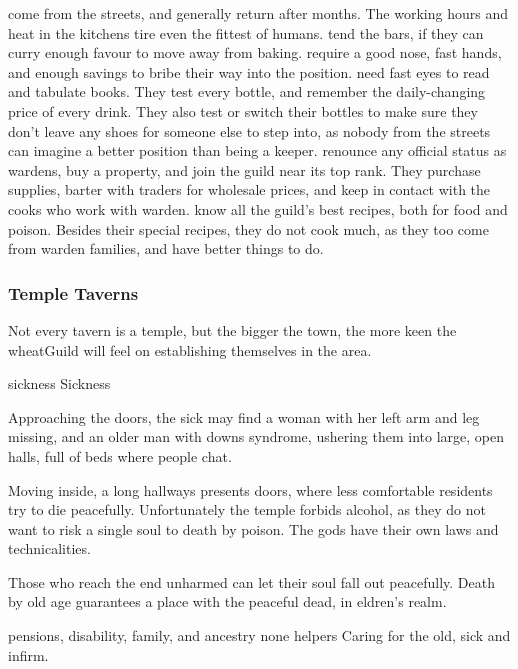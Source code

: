 \begin{multicols}{2}
\begin{description}
  come from the streets, and generally return after months.
  The working hours and heat in the kitchens tire even the fittest of humans.
  tend the bars, if they can curry enough favour to move away from baking.
  require a good nose, fast hands, and enough savings to bribe their way into the position.
  need fast eyes to read and tabulate books.
  They test every bottle, and remember the daily-changing price of every drink.
  They also test or switch their bottles to make sure they don't leave any shoes for someone else to step into, as nobody from the streets can imagine a better position than being a keeper.
  renounce any official status as \glspl{warden}, buy a property, and join the guild near its top rank.
  They purchase supplies, barter with traders for wholesale prices, and keep in contact with the cooks who work with \gls{warden}.
  know all the guild's best recipes, both for food and poison.
  Besides their special recipes, they do not cook much, as they too come from \gls{warden} families, and have better things to do.
\end{description}

\null
\subsubsection{Temple Taverns}

Not every tavern is a temple, but the bigger the town, the more keen the \gls{wheatGuild} will feel on establishing themselves in the area.

  {\gls{sickness}}%
  {Sickness}%
  {
    Approaching the doors, the sick may find a woman with her left arm and leg missing, and an older man with downs syndrome, ushering them into large, open halls, full of beds where people chat.

    Moving inside, a long hallways presents doors, where less comfortable residents try to die peacefully.
    Unfortunately the temple forbids alcohol, as they do not want to risk a single soul to death by poison.
    The gods have their own laws and technicalities.

    Those who reach the end unharmed can let their soul fall out peacefully.
    Death by old age guarantees a place with the peaceful dead, in \gls{eldren}'s realm.
  }%
  {pensions, disability, family, and ancestry}%
  {none}%
  {\Glspl{helper}}%
  {
    Caring for the old, sick and infirm.
  }%


\end{multicols}
